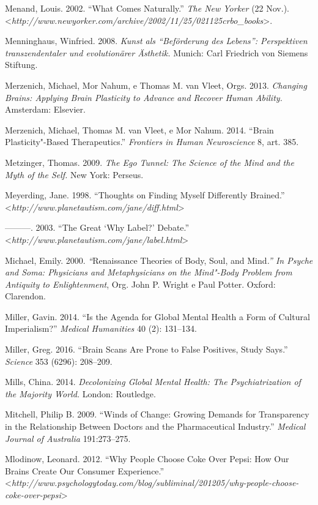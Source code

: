 Menand, Louis. 2002. ``What Comes Naturally.'' \emph{The New Yorker} (22
Nov.).
\textless{}\emph{http://www.newyorker.com/archive/2002/11/25/021125crbo\_books}\textgreater{}.

Menninghaus, Winfried. 2008. \emph{Kunst als ``Beförderung des Lebens'':
Perspektiven transzendentaler und evolutionärer Ästhetik.} Munich: Carl
Friedrich von Siemens Stiftung.

Merzenich, Michael, Mor Nahum, e Thomas M. van Vleet, Orgs. 2013.
\emph{Changing Brains: Applying Brain Plasticity to Advance and Recover
Human Ability.} Amsterdam: Elsevier.

Merzenich, Michael, Thomas M. van Vleet, e Mor Nahum. 2014. ``Brain
Plasticity"-Based Therapeutics.'' \emph{Frontiers in Human Neuroscience}
8, art. 385.

Metzinger, Thomas. 2009. \emph{The Ego Tunnel: The Science of the Mind
and the Myth of the Self.} New York: Perseus.

Meyerding, Jane. 1998. ``Thoughts on Finding Myself Differently
Brained.'' \textless{}\emph{http://www.planetautism.com/jane/diff.html}\textgreater{}

---------. 2003. ``The Great `Why Label?' Debate.''
\textless{}\emph{http://www.planetautism.com/jane/label.html}\textgreater{}

Michael, Emily. 2000. \emph{``}Renaissance Theories of Body, Soul, and
Mind\emph{.'' In Psyche and Soma: Physicians and Metaphysicians on the
Mind"-Body Problem from Antiquity to Enlightenment}, Org. John P. Wright
e Paul Potter. Oxford: Clarendon.

Miller, Gavin. 2014. ``Is the Agenda for Global Mental Health a Form of
Cultural Imperialism?'' \emph{Medical Humanities} 40 (2): 131--134.

Miller, Greg. 2016. ``Brain Scans Are Prone to False Positives, Study
Says.'' \emph{Science} 353 (6296): 208--209.

Mills, China. 2014. \emph{Decolonizing Global Mental Health: The
Psychiatrization of the Majority World.} London: Routledge.

Mitchell, Philip B. 2009. ``Winds of Change: Growing Demands for
Transparency in the Relationship Between Doctors and the Pharmaceutical
Industry.'' \emph{Medical Journal of Australia} 191:273--275.

Mlodinow, Leonard. 2012. ``Why People Choose Coke Over Pepsi: How Our
Brains Create Our Consumer Experience.''
\textless{}\emph{http://www.psychologytoday.com/blog/subliminal/201205/why-people-choose-coke-over-pepsi}\textgreater{}

